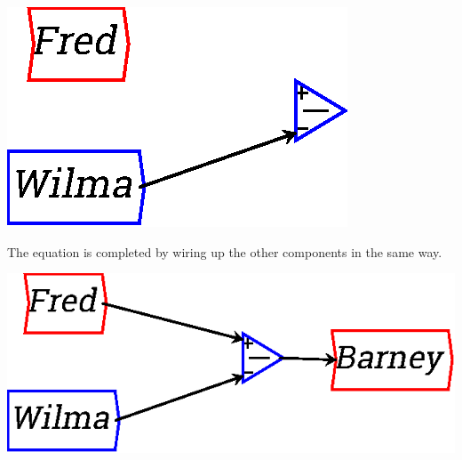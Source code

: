 \begin{center}
\includegraphics{images/NewItem181.eps} 
\end{center}

The equation is completed by wiring up the other components in the same way.

\begin{center}
\includegraphics{images/NewItem182.eps} 
\end{center}
